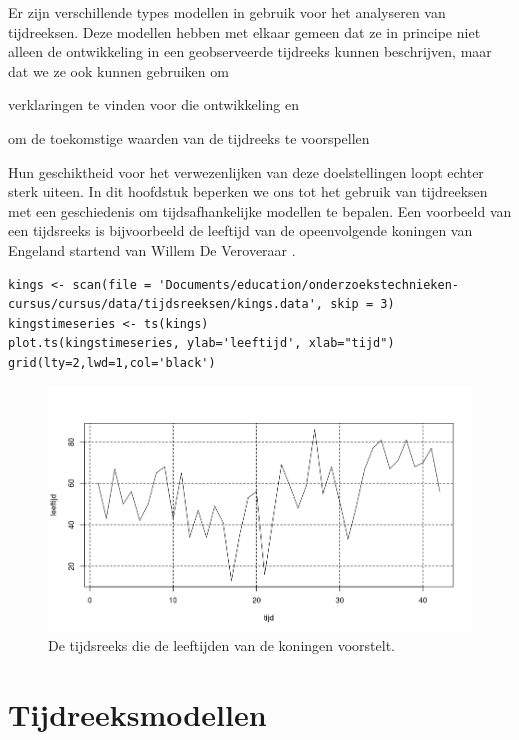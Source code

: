Er zijn verschillende types modellen in gebruik voor het analyseren van tijdreeksen. Deze modellen hebben met elkaar gemeen dat ze in principe niet alleen de ontwikkeling in een geobserveerde tijdreeks kunnen beschrijven, maar dat we ze ook kunnen gebruiken om
\begin{inparaenum}[(i)]
	\item verklaringen te vinden voor die ontwikkeling en
	\item om de toekomstige waarden van de tijdreeks te voorspellen
\end{inparaenum}
Hun geschiktheid voor het verwezenlijken van deze doelstellingen loopt echter sterk uiteen. In dit hoofdstuk beperken we ons tot het gebruik van tijdreeksen met een geschiedenis om tijdsafhankelijke modellen te bepalen. Een voorbeeld van een tijdsreeks is bijvoorbeeld de leeftijd van de opeenvolgende koningen van Engeland startend van Willem De Veroveraar \autocite{Hipel194}.
\begin{lstlisting}
kings <- scan(file = 'Documents/education/onderzoekstechnieken-cursus/cursus/data/tijdsreeksen/kings.data', skip = 3)
kingstimeseries <- ts(kings)
plot.ts(kingstimeseries, ylab='leeftijd', xlab="tijd")
grid(lty=2,lwd=1,col='black')
\end{lstlisting}

\begin{figure}[htbp]
	\centering
	\includegraphics[width=\textwidth]{images/tijdsreeksen/tijdsreekskings.png}
	\caption{De tijdsreeks die de leeftijden van de koningen voorstelt.}
	\label{fig:tijdreeks11}
\end{figure}


\section{Tijdreeksmodellen}
